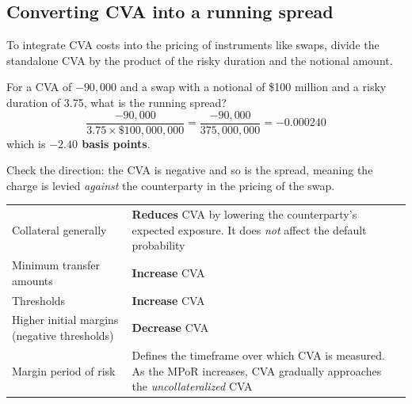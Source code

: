 \subsection*{Converting CVA into a running spread}

To integrate CVA costs into the pricing of instruments like swaps, divide the
standalone CVA by the product of the risky duration and the notional amount.

\begin{crexbox}
For a CVA of $-90{,}000$ and a swap with a notional of \$100 million and a risky
duration of 3.75, what is the running spread?
\tcblower
\[ \frac{-90{,}000}{3.75 \times \$100{,}000{,}000}
   = \frac{-90{,}000}{375{,}000{,}000}
   = -0.000240 \]
which is \textbf{$-2.40$ basis points}.

\smallskip
Check the direction: the CVA is negative and so is the spread, meaning the charge
is levied \emph{against} the counterparty in the pricing of the swap.
\end{crexbox}


\begin{center}
\footnotesize
\begin{tabular}{L{4.4cm} L{10.1cm}}
\toprule
{} &  \\
\midrule
Collateral generally & \textbf{Reduces} CVA by lowering the counterparty's
  expected exposure. It does \emph{not} affect the default probability \\
Minimum transfer amounts & \textbf{Increase} CVA \\
Thresholds & \textbf{Increase} CVA \\
Higher initial margins \newline (negative thresholds) & \textbf{Decrease} CVA \\
Margin period of risk & Defines the timeframe over which CVA is measured. As the
  MPoR increases, CVA gradually approaches the \emph{uncollateralized} CVA \\
\bottomrule
\end{tabular}
\end{center}

